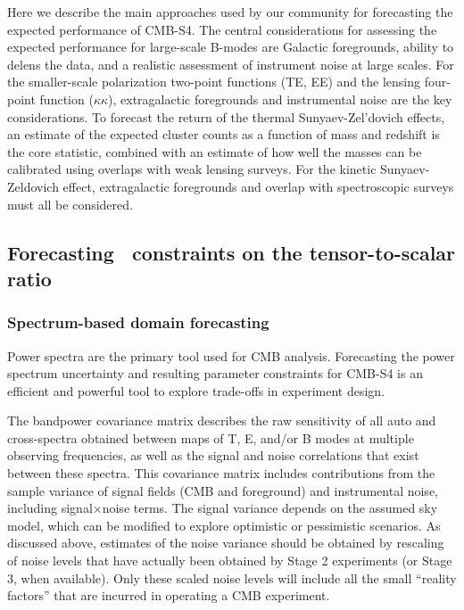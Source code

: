 Here we describe the main approaches used by our community for forecasting the expected performance of CMB-S4. The central considerations for assessing the expected performance for large-scale B-modes are Galactic foregrounds, ability to delens the data, and a realistic assessment of instrument noise at large scales. 
For the smaller-scale polarization two-point functions (TE, EE) and the lensing four-point function ($\kappa \kappa$), extragalactic foregrounds and instrumental noise are the key considerations.
To forecast the return of the thermal Sunyaev-Zel'dovich effects, an estimate of the expected cluster counts as a function of mass and redshift is the core statistic, combined with an estimate of how well the masses can be calibrated using overlaps with weak lensing surveys. For the kinetic Sunyaev-Zeldovich effect, extragalactic foregrounds and overlap with spectroscopic surveys must all be considered. 

\subsection{Forecasting \cmbexp\ constraints on the tensor-to-scalar ratio}

\subsubsection{Spectrum-based domain forecasting}
\label{sec_specforecast}

Power spectra are the primary tool used for CMB analysis.
Forecasting the power spectrum uncertainty and resulting parameter constraints for CMB-S4 is an efficient and powerful tool to explore trade-offs in experiment design.

The bandpower covariance matrix describes the raw sensitivity of all auto and cross-spectra obtained between maps of T, E, and/or B modes at multiple observing frequencies, as well as the signal and noise correlations that exist between these spectra.
This covariance matrix includes contributions from the sample variance of signal fields (CMB and foreground) and instrumental noise, including signal$\times$noise terms.
The signal variance depends on the assumed sky model, which can be modified to explore optimistic or pessimistic scenarios.
As discussed above, estimates of the noise variance should be obtained by rescaling of noise levels that have actually been obtained by Stage 2 experiments (or Stage 3, when available).
Only these scaled noise levels will include all the small ``reality factors'' that are incurred in operating a CMB experiment.

